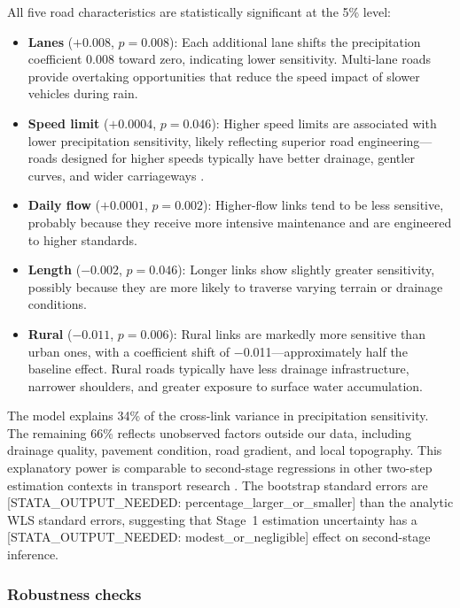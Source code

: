 \documentclass[review]{elsarticle}
\begin{document}
All five road characteristics are statistically significant at the 5\% level:

\begin{itemize}
    \item \textbf{Lanes} ($+0.008$, $p = 0.008$): Each additional lane shifts the precipitation coefficient 0.008 toward zero, indicating lower sensitivity. Multi-lane roads provide overtaking opportunities that reduce the speed impact of slower vehicles during rain.
    \item \textbf{Speed limit} ($+0.0004$, $p = 0.046$): Higher speed limits are associated with lower precipitation sensitivity, likely reflecting superior road engineering---roads designed for higher speeds typically have better drainage, gentler curves, and wider carriageways \citep{raccagni2024urban}.
    \item \textbf{Daily flow} ($+0.0001$, $p = 0.002$): Higher-flow links tend to be less sensitive, probably because they receive more intensive maintenance and are engineered to higher standards.
    \item \textbf{Length} ($-0.002$, $p = 0.046$): Longer links show slightly greater sensitivity, possibly because they are more likely to traverse varying terrain or drainage conditions.
    \item \textbf{Rural} ($-0.011$, $p = 0.006$): Rural links are markedly more sensitive than urban ones, with a coefficient shift of $-$0.011---approximately half the baseline effect. Rural roads typically have less drainage infrastructure, narrower shoulders, and greater exposure to surface water accumulation.
\end{itemize}

The model explains 34\% of the cross-link variance in precipitation sensitivity. The remaining 66\% reflects unobserved factors outside our data, including drainage quality, pavement condition, road gradient, and local topography. This explanatory power is comparable to second-stage regressions in other two-step estimation contexts in transport research \citep{pulugurtha2021aadt}. The bootstrap standard errors are [STATA\_OUTPUT\_NEEDED: percentage\_larger\_or\_smaller] than the analytic WLS standard errors, suggesting that Stage~1 estimation uncertainty has a [STATA\_OUTPUT\_NEEDED: modest\_or\_negligible] effect on second-stage inference.

\subsubsection{Robustness checks}
\end{document}
